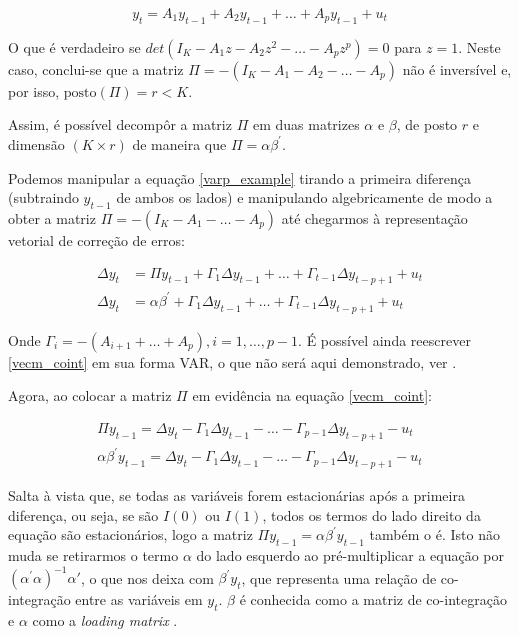 \documentclass[a4paper,
               article,
               12pt,
               openany,
               oneside,
               english,
               brazil]{abntex2}
\numberwithin{equation}{section}
\begin{document}
    \begin{equation}
        \label{varp_example}
        y_t = A_1 y_{t-1} + A_2 y_{t-1} + \dots + A_p y_{t-1} + u_t 
    \end{equation}

    O que é verdadeiro se $ det(I_K - A_1z - A_2z^2 - \dots - A_pz^p) = 0 $ para $ z = 1 $. Neste caso, conclui-se que a matriz $ \Pi = -(I_K - A_1 - A_2 - \dots - A_p) $ não é inversível e, por isso, $ \text{posto}(\Pi) = r < K $.
    
    Assim, é possível decompôr a matriz $ \Pi $ em duas matrizes $ \alpha $ e $ \beta $, de posto $ r $ e dimensão $ (K \times r) $ de maneira que $ \Pi = \alpha \beta^{'} $.

   Podemos manipular a equação \eqref{varp_example} tirando a primeira diferença (subtraindo $ y_{t-1} $ de ambos os lados) e manipulando algebricamente de modo a obter a matriz $ \Pi = -(I_K - A_1 - \dots - A_p) $ até chegarmos à representação vetorial de correção de erros:

   \begin{equation}
       \label{vecm_coint}
       \begin{aligned}
           \Delta y_t &= \Pi y_{t-1} + \Gamma_1 \Delta y_{t-1} + \dots + \Gamma_{t-1} \Delta y_{t-p+1} + u_t \\
           \Delta y_t &= \alpha \beta^{'} + \Gamma_1 \Delta y_{t-1} + \dots + \Gamma_{t-1} \Delta y_{t-p+1} + u_t
       \end{aligned}
   \end{equation}

   Onde $ \Gamma_i = -(A_{i+1} + \dots + A_p), i = 1, \dots, p-1 $. É possível ainda reescrever \eqref{vecm_coint} em sua forma VAR, o que não será aqui demonstrado, ver \cite[p.~248-249]{lutkepool}.

   Agora, ao colocar a matriz $ \Pi $ em evidência na equação \eqref{vecm_coint}:

   \begin{equation}
       \label{vecm_coint2}
       \begin{aligned}
       \Pi y_{t-1} = \Delta y_t - \Gamma_1 \Delta y_{t-1} - \dots - \Gamma_{p-1} \Delta y_{t-p+1} - u_t \\
           \alpha \beta^{'} y_{t-1} = \Delta y_t - \Gamma_1 \Delta y_{t-1} - \dots - \Gamma_{p-1} \Delta y_{t-p+1} - u_t
       \end{aligned}
   \end{equation}

   Salta à vista que, se todas as variáveis forem estacionárias após a primeira diferença, ou seja, se são $ I(0) $ ou $ I(1) $, todos os termos do lado direito da equação são estacionários, logo a matriz $ \Pi y_{t-1} = \alpha \beta^{'} y_{t-1} $ também o é. Isto não muda se retirarmos o termo $ \alpha $ do lado esquerdo ao pré-multiplicar a equação por $ (\alpha^{'}\alpha)^{-1}\alpha{'} $, o que nos deixa com $ \beta^{'}y_{t} $, que representa uma relação de co-integração entre as variáveis em $ y_t $. $ \beta $ é conhecida como a matriz de co-integração e $ \alpha $ como a \textit{loading matrix} \cite[p.~244-249]{lutkepool}.
\end{document}

